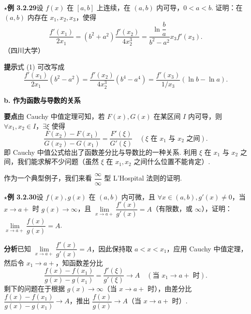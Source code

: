 \documentclass[UTF8,12pt,a4paper,fontset=fandol]{ctexart}
\begin{document}
\noindent\textbf{$\star$例 3.2.29}\quad 设 $f(x)$ 在 $[a,b]$ 上连续，在 $(a,b)$ 内可导，$0<a<b$. 证明：在 $(a,b)$ 内存在 $x_1,x_2,x_3$，使得
\begin{equation}
  \frac{f'(x_1)}{2x_1}
  =(b^2+a^2)\frac{f'(x_2)}{4x_2^3}
  =\frac{\ln\dfrac ba}{b^2-a^2}x_3f'(x_3).
\tag{1}
\end{equation}
（四川大学）

\noindent\textbf{提示}\quad 式 (1) 可改写成
\[
  \frac{f'(x_1)}{2x_1}(b^2-a^2)
  =
  \frac{f'(x_2)}{4x_2^3}(b^4-a^4)
  =
  \frac{f'(x_3)}{1/x_3}(\ln b-\ln a).
\]

\noindent\textbf{b. 作为函数与导数的关系}

\noindent\textbf{要点}\quad 由 Cauchy 中值定理可知，若 $F(x),G(x)$ 在某区间 $I$ 内可导，则 $\forall x_1,x_2\in I$，$\exists\xi$ 使得
\[
  \frac{F(x_2)-F(x_1)}{G(x_2)-G(x_1)}=\frac{F'(\xi)}{G'(\xi)}
  \quad(\xi\text{ 在 }x_1\text{ 与 }x_2\text{ 之间}).
\]
即 Cauchy 中值公式给出了函数差分比与导数比的一种关系. 利用 $\xi$ 在 $x_1$ 与 $x_2$ 之间，我们能求解不少问题（虽然 $\xi$ 在 $x_1,x_2$ 之间什么位置不能肯定）.

作为一个典型例子，我们来看 $\dfrac{\infty}{\infty}$ 型 L'Hospital 法则的证明.

\noindent\textbf{$\star$例 3.2.30}\quad 设 $f(x),g(x)$ 在 $(a,b)$ 内可微，且 $\forall x\in(a,b),g'(x)\ne0$，当 $x\to a+$ 时 $g(x)\to\infty$，且 $\lim\limits_{x\to a+}\dfrac{f'(x)}{g'(x)}=A$（有限数，或 $\infty$），证明：$\lim\limits_{x\to a+}\dfrac{f(x)}{g(x)}=A$.

\noindent\textbf{分析}\quad 已知 $\lim\limits_{x\to a+}\dfrac{f'(x)}{g'(x)}=A$，因此保持取 $a<x<x_1$，应用 Cauchy 中值定理，然后令 $x_1\to a+$，知函数差分比
\begin{equation}
  \frac{f(x)-f(x_1)}{g(x)-g(x_1)}=\frac{f'(\xi)}{g'(\xi)}\to A\quad(\text{当 }x_1\to a+\text{ 时}).
\tag{1}
\end{equation}
剩下的问题在于根据 $g(x)\to\infty$（当 $x\to a+$ 时），由差分比 $\dfrac{f(x)-f(x_1)}{g(x)-g(x_1)}\to A$，推出 $\dfrac{f(x)}{g(x)}\to A$（当 $x\to a+$ 时）.
\end{document}
